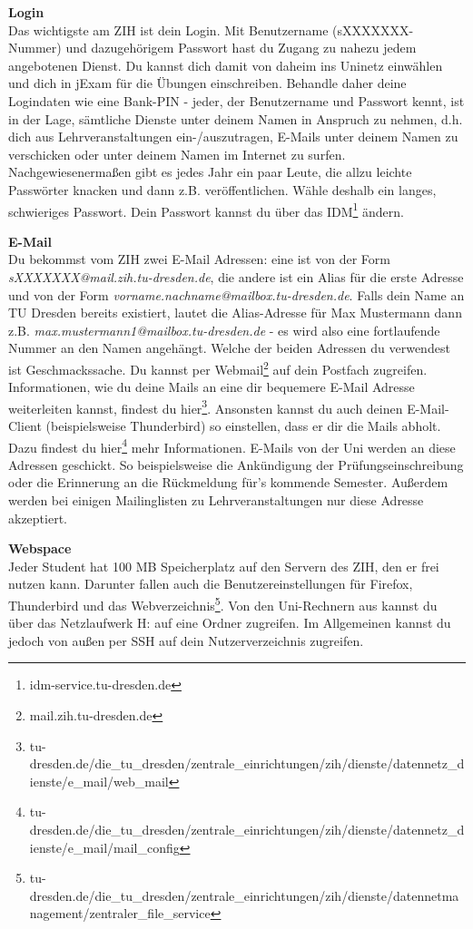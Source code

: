 

\textbf{Login} \\
Das wichtigste am ZIH ist dein Login.
Mit Benutzername (sXXXXXXX-Nummer) und dazugehörigem Passwort hast du Zugang zu nahezu jedem angebotenen Dienst.
Du kannst dich damit von daheim ins Uninetz einwählen und dich in jExam für die Übungen einschreiben.
Behandle daher deine Logindaten wie eine Bank-PIN - jeder, der Benutzername und Passwort kennt, ist in der Lage, sämtliche Dienste unter deinem Namen in Anspruch zu nehmen, d.h. dich aus Lehrveranstaltungen ein-/auszutragen, E-Mails unter deinem Namen zu verschicken oder unter deinem Namen im Internet zu surfen.
Nachgewiesenermaßen gibt es jedes Jahr ein paar Leute, die allzu leichte Passwörter knacken und dann z.B. veröffentlichen.
Wähle deshalb ein langes, schwieriges Passwort. Dein Passwort kannst du über das IDM\footnote{idm-service.tu-dresden.de} ändern.

\textbf{E-Mail} \\
Du bekommst vom ZIH zwei E-Mail Adressen:
eine ist von der Form \textit{sXXXXXXX@mail.zih.tu-dresden.de}, die andere ist ein Alias für die erste Adresse und von der Form \textit{vorname.nachname@mailbox.tu-dresden.de}.
Falls dein Name an TU Dresden bereits existiert, lautet die Alias-Adresse für Max Mustermann dann z.B. \textit{max.mustermann1@mailbox.tu-dresden.de} - es wird also eine fortlaufende Nummer an den Namen angehängt.
Welche der beiden Adressen du verwendest ist Geschmackssache.
Du kannst per Webmail\footnote{mail.zih.tu-dresden.de} auf dein Postfach zugreifen.
Informationen, wie du deine Mails an eine dir bequemere E-Mail Adresse weiterleiten kannst, findest du hier\footnote{tu-dresden.de/die\_tu\_dresden/zentrale\_einrichtungen/zih/dienste/datennetz\_dienste/e\_mail/web\_mail}.
Ansonsten kannst du auch deinen E-Mail-Client (beispielsweise Thunderbird) so einstellen, dass er dir die Mails abholt.
Dazu findest du hier\footnote{tu-dresden.de/die\_tu\_dresden/zentrale\_einrichtungen/zih/dienste/datennetz\_dienste/e\_mail/mail\_config} mehr Informationen.
E-Mails von der Uni werden an diese Adressen geschickt.
So beispielsweise die Ankündigung der Prüfungseinschreibung oder die Erinnerung an die Rückmeldung für's kommende Semester.
Außerdem werden bei einigen Mailinglisten zu Lehrveranstaltungen nur diese Adresse akzeptiert.

\textbf{Webspace} \\
Jeder Student hat 100 MB Speicherplatz auf den Servern des ZIH, den er frei nutzen kann.
Darunter fallen auch die Benutzereinstellungen für Firefox, Thunderbird und das Webverzeichnis\footnote{tu-dresden.de/die\_tu\_dresden/zentrale\_einrichtungen/zih/dienste/datennetmanagement/zentraler\_file\_service}.
Von den Uni-Rechnern aus kannst du über das Netzlaufwerk H: auf eine Ordner zugreifen.
Im Allgemeinen kannst du jedoch von außen per SSH auf dein Nutzerverzeichnis zugreifen.

